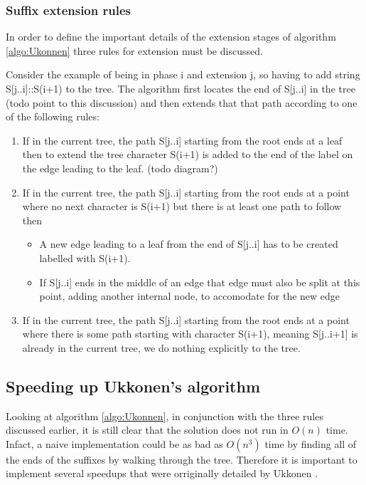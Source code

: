 \documentclass[12pt,twoside,notitlepage]{report}
\begin{document}
				
				
				\subsubsection{Suffix extension rules}
				In order to define the important details of the extension stages of algorithm \ref{algo:Ukonnen} three rules for extension must be discussed.
				
				Consider the example of being in phase i and extension j, so having to add string S[j..i]::S(i+1) to the tree. The algorithm first locates the end of S[j..i] in the tree (todo point to this discussion) and then extends that that path according to one of the following rules:
					\begin{enumerate}
						\item{If in the current tree, the path S[j..i] starting from the root ends at a leaf then to extend the tree character S(i+1) is added to the end of the label on the edge leading to the leaf. (todo diagram?)}
						\item{If in the current tree, the path S[j..i] starting from the root ends at a point where no next character is S(i+1) but there is at least one path to follow then}
							\begin{itemize}
								\item{A new edge leading to a leaf from the end of S[j..i] has to be created labelled with S(i+1).}
								\item{If S[j..i] ends in the middle of an edge that edge must also be split at this point, adding another internal node, to accomodate for the new edge}
							\end{itemize}
						\item{If in the current tree, the path S[j..i] starting from the root ends at a point where there is some path starting with character S(i+1), meaning S[j..i+1] is already in the current tree, we do nothing explicitly to the tree.}
					\end{enumerate}
					
					
			\subsection{Speeding up Ukkonen's algorithm}
				
					Looking at algorithm \ref{algo:Ukonnen}, in conjunction with the three rules discussed earlier, it is still clear that the solution does not run in $O(n)$ time. Infact, a naive implementation could be as bad as $O(n^3)$ time by finding all of the ends of the suffixes by walking through the tree. Therefore it is important to implement several speedups that were orriginally detailed by Ukkonen \cite{Ukkonen1995}.
					
\end{document}
